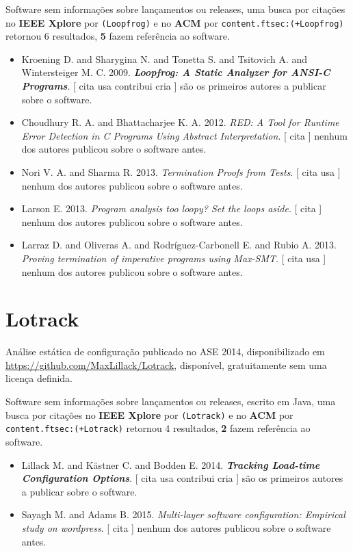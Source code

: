 Software sem informações sobre lançamentos ou releases,
uma busca por citações no {\bf IEEE Xplore} por
\texttt{(Loopfrog)}
e no {\bf ACM} por
\texttt{content.ftsec:(+Loopfrog)}
retornou
6 resultados,
{\bf 5} fazem referência ao software.

\begin{itemize}
\item Kroening D. and Sharygina N. and Tonetta S. and Tsitovich A. and Wintersteiger M. C.
      2009.
        \textbf{\textit{ Loopfrog: A Static Analyzer for ANSI-C Programs}}.
      [
          cita
          usa
          contribui
          cria
      ]
são os primeiros autores a publicar sobre o software.
\item Choudhury R. A. and Bhattacharjee K. A.
      2012.
        \textit{ RED: A Tool for Runtime Error Detection in C Programs Using Abstract Interpretation}.
      [
          cita
      ]
nenhum dos autores publicou sobre o software antes.
\item Nori V. A. and Sharma R.
      2013.
        \textit{ Termination Proofs from Tests}.
      [
          cita
          usa
      ]
nenhum dos autores publicou sobre o software antes.
\item Larson E.
      2013.
        \textit{ Program analysis too loopy? Set the loops aside}.
      [
          cita
      ]
nenhum dos autores publicou sobre o software antes.
\item Larraz D. and Oliveras A. and Rodríguez-Carbonell E. and Rubio A.
      2013.
        \textit{ Proving termination of imperative programs using Max-SMT}.
      [
          cita
          usa
      ]
nenhum dos autores publicou sobre o software antes.
\end{itemize}
\section{Lotrack}

Análise estática de configuração
publicado no ASE 2014,
disponibilizado em \url{https://github.com/MaxLillack/Lotrack},
disponível,
gratuitamente
sem uma licença definida.

Software sem informações sobre lançamentos ou releases,
escrito em Java,
uma busca por citações no {\bf IEEE Xplore} por
\texttt{(Lotrack)}
e no {\bf ACM} por
\texttt{content.ftsec:(+Lotrack)}
retornou
4 resultados,
{\bf 2} fazem referência ao software.

\begin{itemize}
\item Lillack M. and K\"{a}stner C. and Bodden E.
      2014.
        \textbf{\textit{ Tracking Load-time Configuration Options}}.
      [
          cita
          usa
          contribui
          cria
      ]
são os primeiros autores a publicar sobre o software.
\item Sayagh M. and Adams B.
      2015.
        \textit{ Multi-layer software configuration: Empirical study on wordpress}.
      [
          cita
      ]
nenhum dos autores publicou sobre o software antes.
\end{itemize}
